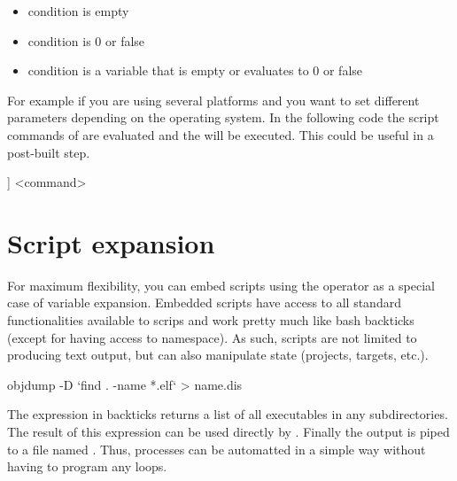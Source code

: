 \begin{itemize}
\item condition is empty
\item condition is 0 or false
\item condition is a variable that is empty or evaluates to 0 or false
\end{itemize}



For example if you are using several platforms and you want to set different parameters depending on the operating system. In the following code the script commands of \codeline{[[ ]]} are evaluated and the  will be executed. This could be useful in a post-built step.

\begin{code}
[[ if (PLATFORM ==  PLATFORM_MSW) { print (_T("cmd /c")); } else { print (_T("sh ")); } ]] <command>
\end{code}

\section{Script expansion}

For maximum flexibility, you can embed scripts using the \codeline{[[ ]]} operator as a special case of variable expansion. Embedded scripts have access to all standard functionalities available to scrips and work pretty much like bash backticks (except for having access to \codeblocks namespace). As such, scripts are not limited to producing text output, but can also manipulate \codeblocks state (projects, targets, etc.).



\begin{cmd}
objdump -D `find . -name *.elf` > name.dis
\end{cmd}

The expression in backticks returns a list of all executables  in any subdirectories. The result of this expression can be used directly by . Finally the output is piped to a file named  . Thus, processes can be automatted in a simple way without having to program any loops.

